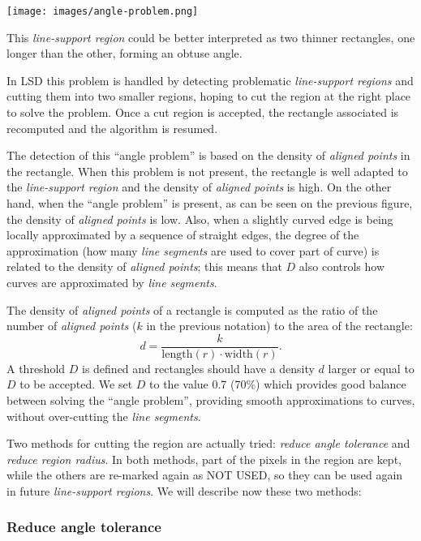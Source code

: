 \documentclass{ipol}
\begin{document}
\begin{center}
\texttt{[image: images/angle-problem.png]}
\end{center}

This \emph{line-support region} could be better interpreted as two
thinner rectangles, one longer than the other, forming an obtuse
angle.

In LSD this problem is handled by detecting
problematic \emph{line-support regions} and cutting them into two
smaller regions, hoping to cut the region at the right place to solve
the problem. Once a cut region is accepted, the rectangle associated
is recomputed and the algorithm is resumed.

The detection of this ``angle problem'' is based on the density of
\emph{aligned points} in the rectangle. When this problem is not present,
the rectangle is well adapted to the \emph{line-support region} and
the density of \emph{aligned points} is high. On the other hand, when
the ``angle problem'' is present, as can be seen on the previous
figure, the density of \emph{aligned points} is low. Also, when a
slightly curved edge is being locally approximated by a sequence of
straight edges, the degree of the approximation (how many \emph{line
segments} are used to cover part of curve) is related to the density
of \emph{aligned points}; this means that $D$ also controls how curves
are approximated by \emph{line segments}.

The density of \emph{aligned points} of a rectangle is computed as the
ratio of the number of \emph{aligned points} ($k$ in the previous
notation) to the area of the rectangle:
$$
   d = \frac{k}{\textrm{length}(r) \cdot \textrm{width}(r)}.
$$
A threshold $D$ is defined and rectangles should have a density $d$
larger or equal to $D$ to be accepted. We set $D$ to the value 0.7
(70\%) which provides good balance between solving the ``angle
problem'', providing smooth approximations to curves, without
over-cutting the \emph{line segments}.

Two methods for cutting the region are actually tried: \emph{reduce
angle tolerance} and \emph{reduce region radius}. In both methods,
part of the pixels in the region are kept, while the others are
re-marked again as NOT USED, so they can be used again in
future \emph{line-support regions}.  We will describe now these two
methods:

\subsubsection{Reduce angle tolerance}
\end{document}
